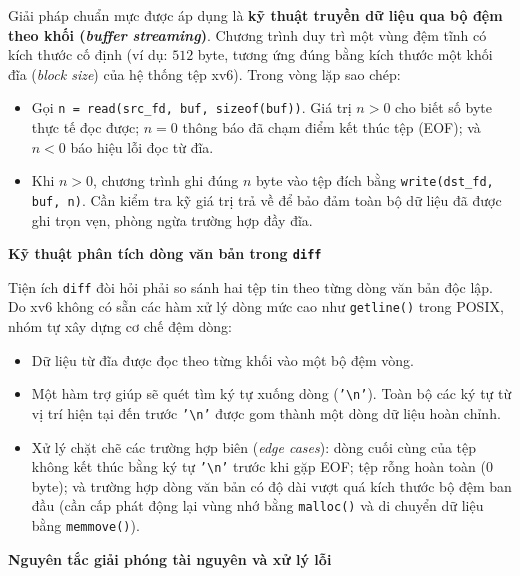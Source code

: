 \documentclass[12pt,a4paper]{article}
\begin{document}
Giải pháp chuẩn mực được áp dụng là \textbf{kỹ thuật truyền dữ liệu qua bộ đệm theo khối (\textit{buffer streaming})}. Chương trình duy trì một vùng đệm tĩnh có kích thước cố định (ví dụ: $512$ byte, tương ứng đúng bằng kích thước một khối đĩa (\textit{block size}) của hệ thống tệp xv6). Trong vòng lặp sao chép:
\begin{itemize}
  \item Gọi \texttt{n = read(src\_fd, buf, sizeof(buf))}. Giá trị $n > 0$ cho biết số byte thực tế đọc được; $n = 0$ thông báo đã chạm điểm kết thúc tệp (EOF); và $n < 0$ báo hiệu lỗi đọc từ đĩa.
  \item Khi $n > 0$, chương trình ghi đúng $n$ byte vào tệp đích bằng \texttt{write(dst\_fd, buf, n)}. Cần kiểm tra kỹ giá trị trả về để bảo đảm toàn bộ dữ liệu đã được ghi trọn vẹn, phòng ngừa trường hợp đầy đĩa.
\end{itemize}

\textbf{Kỹ thuật phân tích dòng văn bản trong \texttt{diff}}

Tiện ích \texttt{diff} đòi hỏi phải so sánh hai tệp tin theo từng dòng văn bản độc lập. Do xv6 không có sẵn các hàm xử lý dòng mức cao như \texttt{getline()} trong POSIX, nhóm tự xây dựng cơ chế đệm dòng:
\begin{itemize}
  \item Dữ liệu từ đĩa được đọc theo từng khối vào một bộ đệm vòng.
  \item Một hàm trợ giúp sẽ quét tìm ký tự xuống dòng (\texttt{'\textbackslash n'}). Toàn bộ các ký tự từ vị trí hiện tại đến trước \texttt{'\textbackslash n'} được gom thành một dòng dữ liệu hoàn chỉnh.
  \item Xử lý chặt chẽ các trường hợp biên (\textit{edge cases}): dòng cuối cùng của tệp không kết thúc bằng ký tự \texttt{'\textbackslash n'} trước khi gặp EOF; tệp rỗng hoàn toàn ($0$ byte); và trường hợp dòng văn bản có độ dài vượt quá kích thước bộ đệm ban đầu (cần cấp phát động lại vùng nhớ bằng \texttt{malloc()} và di chuyển dữ liệu bằng \texttt{memmove()}).
\end{itemize}

\textbf{Nguyên tắc giải phóng tài nguyên và xử lý lỗi}
\end{document}
